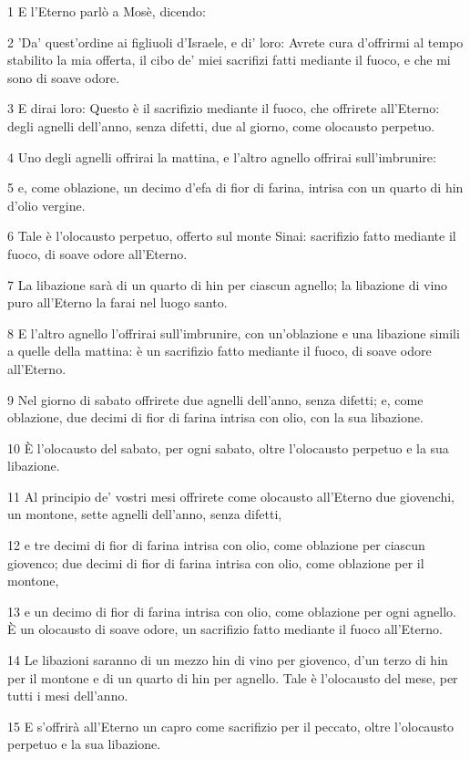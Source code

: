 \par 1 E l'Eterno parlò a Mosè, dicendo:
\par 2 'Da' quest'ordine ai figliuoli d'Israele, e di' loro: Avrete cura d'offrirmi al tempo stabilito la mia offerta, il cibo de' miei sacrifizi fatti mediante il fuoco, e che mi sono di soave odore.
\par 3 E dirai loro: Questo è il sacrifizio mediante il fuoco, che offrirete all'Eterno: degli agnelli dell'anno, senza difetti, due al giorno, come olocausto perpetuo.
\par 4 Uno degli agnelli offrirai la mattina, e l'altro agnello offrirai sull'imbrunire:
\par 5 e, come oblazione, un decimo d'efa di fior di farina, intrisa con un quarto di hin d'olio vergine.
\par 6 Tale è l'olocausto perpetuo, offerto sul monte Sinai: sacrifizio fatto mediante il fuoco, di soave odore all'Eterno.
\par 7 La libazione sarà di un quarto di hin per ciascun agnello; la libazione di vino puro all'Eterno la farai nel luogo santo.
\par 8 E l'altro agnello l'offrirai sull'imbrunire, con un'oblazione e una libazione simili a quelle della mattina: è un sacrifizio fatto mediante il fuoco, di soave odore all'Eterno.
\par 9 Nel giorno di sabato offrirete due agnelli dell'anno, senza difetti; e, come oblazione, due decimi di fior di farina intrisa con olio, con la sua libazione.
\par 10 È l'olocausto del sabato, per ogni sabato, oltre l'olocausto perpetuo e la sua libazione.
\par 11 Al principio de' vostri mesi offrirete come olocausto all'Eterno due giovenchi, un montone, sette agnelli dell'anno, senza difetti,
\par 12 e tre decimi di fior di farina intrisa con olio, come oblazione per ciascun giovenco; due decimi di fior di farina intrisa con olio, come oblazione per il montone,
\par 13 e un decimo di fior di farina intrisa con olio, come oblazione per ogni agnello. È un olocausto di soave odore, un sacrifizio fatto mediante il fuoco all'Eterno.
\par 14 Le libazioni saranno di un mezzo hin di vino per giovenco, d'un terzo di hin per il montone e di un quarto di hin per agnello. Tale è l'olocausto del mese, per tutti i mesi dell'anno.
\par 15 E s'offrirà all'Eterno un capro come sacrifizio per il peccato, oltre l'olocausto perpetuo e la sua libazione.
